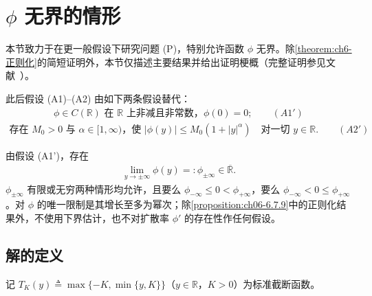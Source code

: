 \documentclass[../../main.tex]{subfiles}%
\begin{document}
\section{$\phi$ 无界的情形}\label{section:ch06-无界phi}

本节致力于在更一般假设下研究问题 (P)，特别允许函数 $\phi$ 无界。除\cref{theorem:ch6-正则化}的简短证明外，本节仅描述主要结果并给出证明梗概（完整证明参见文献~\cite{ref87}）。

此后假设 (A1)--(A2) 由如下两条假设替代：
\begin{align*}
\phi\in C(\mathbb{R})\text{ 在 }\mathbb{R}\text{ 上非减且非常数，}\phi(0)=0; \qquad(A1')
\end{align*}
\begin{align}
\text{存在 }M_0>0\text{ 与 }\alpha\in[1,\infty)\text{，使 }|\phi(y)|\leqslant M_0(1+|y|^{\alpha})
\quad\text{对一切 }y\in\mathbb{R}. \qquad(A2') \label{align:ch6-A2p}
\end{align}

由假设 (A1')，存在
\begin{align}
\lim_{y\to\pm\infty}\phi(y)=:\phi_{\pm\infty}\in\overline{\mathbb{R}}. \label{align:ch6-6.131}
\end{align}
$\phi_{\pm\infty}$ 有限或无穷两种情形均允许，且要么 $\phi_{-\infty}\leqslant0<\phi_{+\infty}$，要么 $\phi_{-\infty}<0\leqslant\phi_{+\infty}$。对 $\phi$ 的唯一限制是其增长至多为幂次；除\cref{proposition:ch06-6.7.9}中的正则化结果外，不使用下界估计，也不对扩散率 $\phi'$ 的存在性作任何假设。

\subsection{解的定义}\label{subsection:ch06-无界解定义}

记 $T_K(y)\triangleq\max\{-K,\min\{y,K\}\}$（$y\in\mathbb{R}$，$K>0$）为标准截断函数。
\end{document}
